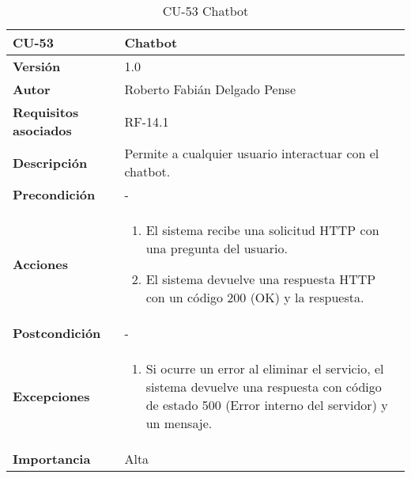 \begin{table}[p]
	\centering
	\begin{tabularx}{\linewidth}{ p{} p{} }
		\toprule
		\textbf{CU-53}    & \textbf{Chatbot}\\
		\toprule
		\textbf{Versión}              & 1.0    \\
		\textbf{Autor}                & Roberto Fabián Delgado Pense \\
		\textbf{Requisitos asociados} & RF-14.1 \\ 
		\textbf{Descripción}          & Permite a cualquier usuario interactuar con el chatbot. \\
		\textbf{Precondición}         & -\\
		\textbf{Acciones}             &
		\begin{enumerate}
			\def\labelenumi{\arabic{enumi}.}
			\tightlist
			\item El sistema recibe una solicitud HTTP con una pregunta del usuario.
                \item El sistema devuelve una respuesta HTTP con un código 200 (OK) y la respuesta.
            \end{enumerate}\\
		\textbf{Postcondición}        & -\\
		\textbf{Excepciones}          & 
            \begin{enumerate}
			\def\labelenumi{\arabic{enumi}.}
			\tightlist
                \item Si ocurre un error al eliminar el servicio, el sistema devuelve una respuesta con código de estado 500 (Error interno del servidor) y un mensaje.
            \end{enumerate}\\
		\textbf{Importancia}          & Alta \\
		\bottomrule
	\end{tabularx}
	\caption{CU-53 Chatbot}
\end{table}